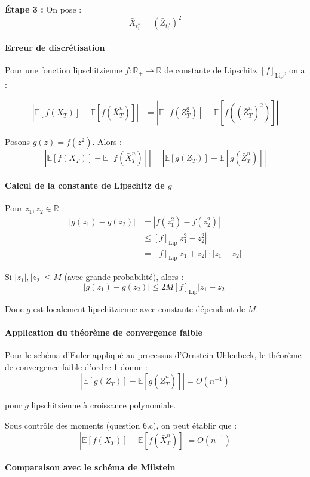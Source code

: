 \documentclass[12pt,a4paper]{article}
\theoremstyle{definition}
\theoremstyle{remark}
\newcommand{\R}{\mathbb{R}}
\newcommand{\E}{\mathbb{E}}
\begin{document}
\textbf{Étape 3 :} On pose :
\[
\bar{X}_{t_i^n} = (\bar{Z}_{t_i^n})^2
\]

\paragraph{Erreur de discrétisation}

Pour une fonction lipschitzienne $f : \R_+ \to \R$ de constante de Lipschitz $[f]_{\text{Lip}}$, on a :

\begin{align*}
|\E[f(X_T)] - \E[f(\bar{X}_T^n)]| &= |\E[f(Z_T^2)] - \E[f((\bar{Z}_T^n)^2)]|
\end{align*}

Posons $g(z) = f(z^2)$. Alors :
\[
|\E[f(X_T)] - \E[f(\bar{X}_T^n)]| = |\E[g(Z_T)] - \E[g(\bar{Z}_T^n)]|
\]

\paragraph{Calcul de la constante de Lipschitz de $g$}

Pour $z_1, z_2 \in \R$ :
\begin{align*}
|g(z_1) - g(z_2)| &= |f(z_1^2) - f(z_2^2)| \\
&\leq [f]_{\text{Lip}} |z_1^2 - z_2^2| \\
&= [f]_{\text{Lip}} |z_1 + z_2| \cdot |z_1 - z_2|
\end{align*}

Si $|z_1|, |z_2| \leq M$ (avec grande probabilité), alors :
\[
|g(z_1) - g(z_2)| \leq 2M[f]_{\text{Lip}} |z_1 - z_2|
\]

Donc $g$ est localement lipschitzienne avec constante dépendant de $M$.

\paragraph{Application du théorème de convergence faible}

Pour le schéma d'Euler appliqué au processus d'Ornstein-Uhlenbeck, le théorème de convergence faible d'ordre 1 donne :
\[
|\E[g(Z_T)] - \E[g(\bar{Z}_T^n)]| = O(n^{-1})
\]

pour $g$ lipschitzienne à croissance polynomiale.

Sous contrôle des moments (question 6.c), on peut établir que :
\[
|\E[f(X_T)] - \E[f(\bar{X}_T^n)]| = O(n^{-1})
\]

\paragraph{Comparaison avec le schéma de Milstein}
\end{document}
